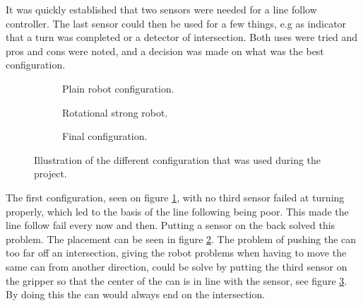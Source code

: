 It was quickly established that two sensors were needed for a line follow controller. The last sensor could then be used for a few things, e.g as indicator that a turn was completed or a detector of intersection. Both uses were tried and pros and cons were noted, and a decision was made on what was the best configuration.

\begin{figure}[H]
 \begin{subfigure}{0.32\textwidth}
 \centering
  \caption{Plain robot configuration.}
  \label{subfig:plain_robot}
 \end{subfigure}
 \begin{subfigure}{0.32\textwidth}
 \centering
  \caption{Rotational strong robot.}
  \label{subfig:rot_robot}
 \end{subfigure}
 \begin{subfigure}{0.32\textwidth}
 \centering
  \caption{Final configuration.}
  \label{subfig:final_robot}
 \end{subfigure}
\caption{Illustration of the different configuration that was used during the project.}
\label{fig:line_follow}
\end{figure}

The first configuration, seen on figure \ref{subfig:plain_robot}, with no third sensor failed at turning properly, which led to the basis of the line following being poor. This made the line follow fail every now and then. Putting a sensor on the back solved this problem. The placement can be seen in figure \ref{subfig:rot_robot}. The problem of pushing the can too far off an intersection, giving the robot problems when having to move the same can from another direction, could be solve by putting the third sensor on the gripper so that the center of the can is in line with the sensor, see figure \ref{subfig:final_robot}. By doing this the can would always end on the intersection. 

